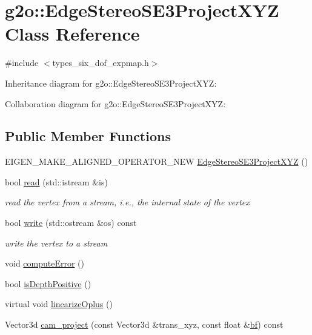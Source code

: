 \hypertarget{classg2o_1_1EdgeStereoSE3ProjectXYZ}{}\section{g2o\+:\+:Edge\+Stereo\+S\+E3\+Project\+X\+YZ Class Reference}
\label{classg2o_1_1EdgeStereoSE3ProjectXYZ}


{\ttfamily \#include $<$types\+\_\+six\+\_\+dof\+\_\+expmap.\+h$>$}



Inheritance diagram for g2o\+:\+:Edge\+Stereo\+S\+E3\+Project\+X\+YZ\+:


Collaboration diagram for g2o\+:\+:Edge\+Stereo\+S\+E3\+Project\+X\+YZ\+:
\subsection*{Public Member Functions}
\begin{DoxyCompactItemize}
\item 
E\+I\+G\+E\+N\+\_\+\+M\+A\+K\+E\+\_\+\+A\+L\+I\+G\+N\+E\+D\+\_\+\+O\+P\+E\+R\+A\+T\+O\+R\+\_\+\+N\+EW \hyperlink{classg2o_1_1EdgeStereoSE3ProjectXYZ_a3a9c1b7c0b165f8c1c0690373481fea5}{Edge\+Stereo\+S\+E3\+Project\+X\+YZ} ()
\item 
bool \hyperlink{classg2o_1_1EdgeStereoSE3ProjectXYZ_a59cdc820a694379a73a26d51d948db0e}{read} (std\+::istream \&is)
\begin{DoxyCompactList}\small\item\em read the vertex from a stream, i.\+e., the internal state of the vertex \end{DoxyCompactList}\item 
bool \hyperlink{classg2o_1_1EdgeStereoSE3ProjectXYZ_acda965a32bd3aeb156cbd5883d19e864}{write} (std\+::ostream \&os) const 
\begin{DoxyCompactList}\small\item\em write the vertex to a stream \end{DoxyCompactList}\item 
void \hyperlink{classg2o_1_1EdgeStereoSE3ProjectXYZ_ab60521439da10eabb13f23fe21fbe651}{compute\+Error} ()
\item 
bool \hyperlink{classg2o_1_1EdgeStereoSE3ProjectXYZ_ac176aff8aa08a73f52d7a0f5c3080d4d}{is\+Depth\+Positive} ()
\item 
virtual void \hyperlink{classg2o_1_1EdgeStereoSE3ProjectXYZ_aea04d86a304c6cb4e2a3f34b35166f30}{linearize\+Oplus} ()
\item 
Vector3d \hyperlink{classg2o_1_1EdgeStereoSE3ProjectXYZ_ae5fdd198e102b905c66f0b18c7660767}{cam\+\_\+project} (const Vector3d \&trans\+\_\+xyz, const float \&\hyperlink{classg2o_1_1EdgeStereoSE3ProjectXYZ_afc94291834aa40d18205e61ac802cbfc}{bf}) const 
\end{DoxyCompactItemize}
